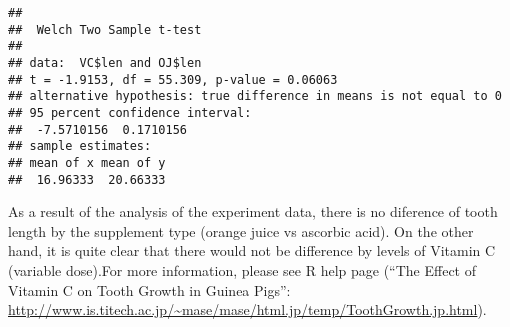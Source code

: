 \documentclass[]{article}
\newenvironment{Shaded}{\begin{snugshade}}{\end{snugshade}}
\newcommand{\KeywordTok}[1]{\textcolor[rgb]{0.13,0.29,0.53}{\textbf{#1}}}
\newcommand{\DataTypeTok}[1]{\textcolor[rgb]{0.13,0.29,0.53}{#1}}
\newcommand{\OtherTok}[1]{\textcolor[rgb]{0.56,0.35,0.01}{#1}}
\newcommand{\OperatorTok}[1]{\textcolor[rgb]{0.81,0.36,0.00}{\textbf{#1}}}
\newcommand{\NormalTok}[1]{#1}
\begin{document}
\begin{Shaded}
\end{Shaded}

\begin{verbatim}
## 
##  Welch Two Sample t-test
## 
## data:  VC$len and OJ$len
## t = -1.9153, df = 55.309, p-value = 0.06063
## alternative hypothesis: true difference in means is not equal to 0
## 95 percent confidence interval:
##  -7.5710156  0.1710156
## sample estimates:
## mean of x mean of y 
##  16.96333  20.66333
\end{verbatim}

As a result of the analysis of the experiment data, there is no
diference of tooth length by the supplement type (orange juice vs
ascorbic acid). On the other hand, it is quite clear that there would
not be difference by levels of Vitamin C (variable dose).For more
information, please see R help page (``The Effect of Vitamin C on Tooth
Growth in Guinea Pigs'':
\url{http://www.is.titech.ac.jp/~mase/mase/html.jp/temp/ToothGrowth.jp.html}).
\end{document}
